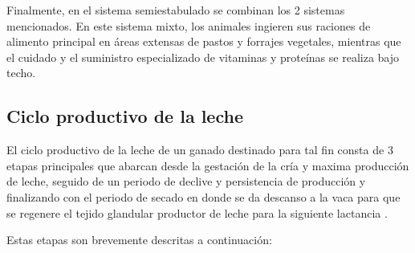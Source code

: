 Finalmente, en el sistema semiestabulado se combinan los 2 sistemas mencionados. En este sistema mixto, los animales ingieren sus raciones de alimento principal en áreas extensas de pastos y forrajes vegetales, mientras que el cuidado y el suministro especializado de vitaminas y proteínas se realiza bajo techo.

\subsection{Ciclo productivo de la leche}

El ciclo productivo de la leche de un ganado destinado para tal fin consta de 3 etapas principales que abarcan desde la gestación de la cría y maxima producción de leche, seguido de un periodo de declive y persistencia de producción y finalizando con el periodo de secado en donde se da descanso a la vaca para que se regenere el tejido glandular productor de leche para la siguiente lactancia \cite{mahecha}.

Estas etapas son brevemente descritas a continuación:


